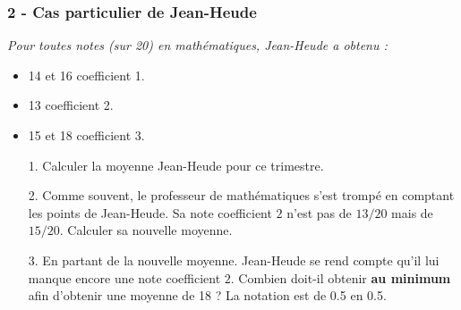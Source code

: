 \documentclass[11pt]{article}
\begin{document}
\begin{multicols}{2}

\subsubsection*{2 - Cas particulier de Jean-Heude}

  \textit{Pour toutes notes (sur 20)  en mathématiques, Jean-Heude a obtenu :}

  \begin{itemize}
  \item 14 et 16 coefficient 1.
  \item 13 coefficient 2.
  \item 15 et 18 coefficient 3.
  \end{itemize}

  \begin{enumerate}
  \item[1.] Calculer la moyenne Jean-Heude pour ce trimestre.
  \item[2.] Comme souvent, le professeur de mathématiques s'est trompé en comptant les points de Jean-Heude. Sa note coefficient $2$ n'est pas de $13/20$ mais de $15/20$. Calculer sa nouvelle moyenne.
  \item[3.] En partant de la nouvelle moyenne. Jean-Heude se rend compte qu'il lui manque encore une note coefficient $2$. Combien doit-il obtenir \textbf{au minimum} afin d'obtenir une moyenne de 18 ? La notation est de 0.5 en 0.5.
  \end{enumerate}
\end{multicols}
\end{document}
